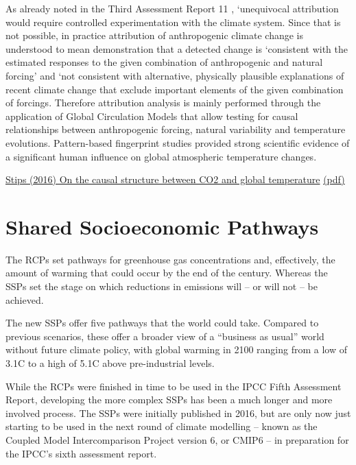 \documentclass[
]{book}
\begin{document}
As already noted in the Third Assessment Report 11 ,
`unequivocal attribution would require controlled experimentation
with the climate system.
Since that is not possible, in practice attribution of anthropogenic
climate change is understood to mean
demonstration that a detected change is
`consistent with the estimated responses to the given combination of
anthropogenic and natural forcing' and
`not consistent with alternative, physically plausible explanations of
recent climate change that exclude important
elements of the given combination of forcings.
Therefore attribution analysis is mainly performed through the
application of Global Circulation Models that allow
testing for causal relationships between anthropogenic forcing,
natural variability and temperature evolutions.
Pattern-based fingerprint studies provided strong scientific evidence of a
significant human influence on global atmospheric temperature changes.

\href{https://www.natur\%20e.com/articles/srep21691}{Stips (2016) On the causal structure between CO2 and global temperature}
\href{pdf/Stips_2016_Causal_structure_CO2_temperature.pdf}{(pdf)}

\hypertarget{shared-socioeconomic-pathways}{%
\section{Shared Socioeconomic Pathways}\label{shared-socioeconomic-pathways}}

The RCPs set pathways for greenhouse gas concentrations and, effectively, the amount of warming that could occur by the end of the century. Whereas the SSPs set the stage on which reductions in emissions will -- or will not -- be achieved.

The new SSPs offer five pathways that the world could take. Compared to previous scenarios, these offer a broader view of a ``business as usual'' world without future climate policy, with global warming in 2100 ranging from a low of 3.1C to a high of 5.1C above pre-industrial levels.

While the RCPs were finished in time to be used in the IPCC Fifth Assessment Report, developing the more complex SSPs has been a much longer and more involved process. The SSPs were initially published in 2016, but are only now just starting to be used in the next round of climate modelling -- known as the Coupled Model Intercomparison Project version 6, or CMIP6 -- in preparation for the IPCC's sixth assessment report.
\end{document}
